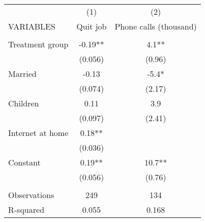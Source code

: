 \begin{tabular}{lcc} \hline
 & (1) & (2) \\
VARIABLES & Quit job & Phone calls (thousand) \\ \hline
 &  &  \\
Treatment group & -0.19** & 4.1** \\
 & (0.056) & (0.96) \\
Married & -0.13 & -5.4* \\
 & (0.074) & (2.17) \\
Children & 0.11 & 3.9 \\
 & (0.097) & (2.41) \\
Internet at home & 0.18** &  \\
 & (0.036) &  \\
Constant & 0.19** & 10.7** \\
 & (0.056) & (0.76) \\
 &  &  \\
Observations & 249 & 134 \\
 R-squared & 0.055 & 0.168 \\ \hline
\end{tabular}
